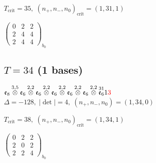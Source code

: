 \documentclass[10pt]{article}
\begin{document}
\hspace{1em}$T_{\text{crit}}=35,\; (n_+,n_-,n_0)_{\text{crit}}=(1,31,1)$

\hspace{2em}$\left(\begin{smallmatrix}0 & 2 & 2 \\ 2 & 4 & 4 \\ 2 & 4 & 4\end{smallmatrix}\right)_{\!b_0}$


\subsection*{$T = 34$ \quad (1 bases)}
\smallskip

$\mathfrak{e}_8\overset{3,5}{\otimes}\mathfrak{e}_6\overset{2,2}{\otimes}\mathfrak{e}_6\overset{2,2}{\otimes}\mathfrak{e}_6\overset{2,2}{\otimes}\mathfrak{e}_6\overset{2,2}{\otimes}\mathfrak{e}_6\overset{2,2}{\otimes}\overset{31}{\mathfrak{e}_6}1\textcolor{red}{3}$ \quad $\Delta=-128,\; |\det|=4,\; (n_+,n_-,n_0)=(1,34,0)$

\hspace{1em}$T_{\text{crit}}=38,\; (n_+,n_-,n_0)_{\text{crit}}=(1,34,1)$

\hspace{2em}$\left(\begin{smallmatrix}0 & 2 & 2 \\ 2 & 0 & 2 \\ 2 & 2 & 4\end{smallmatrix}\right)_{\!b_0}$
\end{document}
